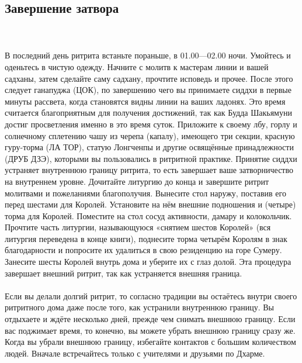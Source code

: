 \subsection{Завершение затвора}
\\ \\ В последний день ритрита встаньте пораньше, в 01.00—02.00 ночи. Умойтесь и оденьтесь в чистую одежду. Начните с молитв к мастерам линии и вашей садханы, затем сделайте саму садхану, прочтите исповедь и прочее. После этого следует ганапуджа (ЦОК), по завершению чего вы принимаете сиддхи в первые минуты рассвета, когда становятся видны линии на ваших ладонях. Это время считается благоприятным для получения достижений, так как Будда Шакьямуни достиг просветления именно в это время суток. Приложите к своему лбу, горлу и солнечному сплетению чашу из черепа (капалу), имеющего три секции, красную гуру-торма (ЛА ТОР), статую Лонгченпы и другие освящённые принадлежности (ДРУБ ДЗЭ), которыми вы пользовались в ритритной практике. Принятие сиддхи устраняет внутреннюю границу ритрита, то есть завершает ваше затворничество на внутреннем уровне. Дочитайте литургию до конца и завершите ритрит молитвами и пожеланиями благополучия. Вынесите стол наружу, поставив его перед шестами для Королей. Установите на нём внешние подношения и (четыре) торма для Королей. Поместите на стол сосуд активности, дамару и колокольчик. Прочтите часть литургии, называющуюся «снятием шестов Королей» (вся литургия переведена в конце книги), поднесите торма четырём Королям в знак благодарности и попросите их удалиться в свою резиденцию на горе Сумеру. Занесите шесты Королей внутрь дома и уберите их с глаз долой. Эта процедура завершает внешний ритрит, так как устраняется внешняя граница.
\\ \\ Если вы делали долгий ритрит, то согласно традиции вы остаётесь внутри своего ритритного дома даже после того, как устранили внутреннюю границу. Вы отдыхаете и ждёте несколько дней, прежде чем снимать внешнюю границу. Если вас поджимает время, то конечно, вы можете убрать внешнюю границу сразу же. Когда вы убрали внешнюю границу, избегай\-те контактов с большим количеством людей. Вначале встречайтесь только с учителями и друзьями по Дхарме.
